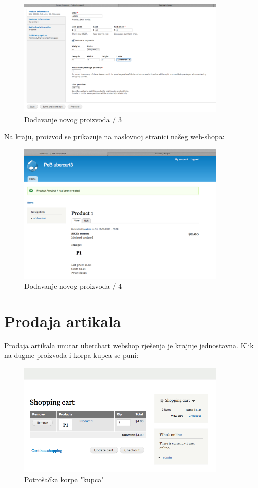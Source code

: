 \documentclass[times, utf8, seminar]{fit}
\begin{document}
{{{\begin{figure}[H]
\centering
\includegraphics[width=10cm]{img/drupal_add_content_3.png}
\caption{Dodavanje novog proizvoda / 3}
\end{figure}

Na kraju, proizvod se prikazuje na naslovnoj stranici našeg web-shopa:

\begin{figure}[H]
\centering
\includegraphics[width=10cm]{img/drupal_add_content_4.png}
\caption{Dodavanje novog proizvoda / 4}
\end{figure}

\section{Prodaja artikala}

Prodaja artikala unutar uberchart webshop rješenja je krajnje jednostavna. Klik na dugme proizvoda i korpa kupca se puni:

\begin{figure}[H]
\centering
\includegraphics[width=10cm]{img/prodaja.png}
\caption{Potrošačka korpa "kupca"}
\end{figure}

}}}
\end{document}
